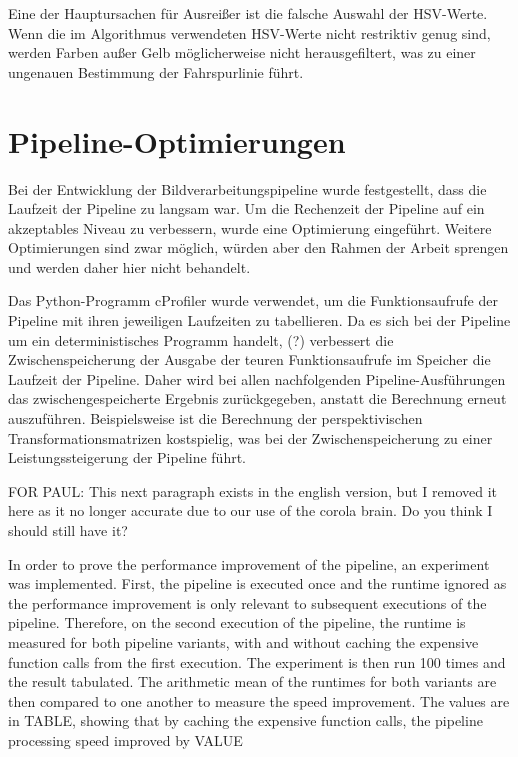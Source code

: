 \documentclass[arbeit=studie,oneside,BCOR=12mm]{ArbeitRST}
\begin{document}
Eine der Hauptursachen für Ausreißer ist die falsche Auswahl der HSV-Werte.
Wenn die im Algorithmus verwendeten HSV-Werte nicht restriktiv genug sind,
werden Farben außer Gelb möglicherweise nicht herausgefiltert, was zu einer
ungenauen Bestimmung der Fahrspurlinie führt.


\section{Pipeline-Optimierungen}

Bei der Entwicklung der Bildverarbeitungspipeline wurde festgestellt, dass die
Laufzeit der Pipeline zu langsam war. Um die Rechenzeit der Pipeline auf ein
akzeptables Niveau zu verbessern, wurde eine Optimierung eingeführt. Weitere
Optimierungen sind zwar möglich, würden aber den Rahmen der Arbeit sprengen und
werden daher hier nicht behandelt.

Das Python-Programm cProfiler wurde verwendet, um die Funktionsaufrufe der
Pipeline mit ihren jeweiligen Laufzeiten zu tabellieren. Da es sich bei der
Pipeline um ein deterministisches Programm handelt, (?) verbessert die
Zwischenspeicherung der Ausgabe der teuren Funktionsaufrufe im Speicher die
Laufzeit der Pipeline. Daher wird bei allen nachfolgenden Pipeline-Ausführungen
das zwischengespeicherte Ergebnis zurückgegeben, anstatt die Berechnung erneut
auszuführen. Beispielsweise ist die Berechnung der perspektivischen
Transformationsmatrizen kostspielig, was bei der Zwischenspeicherung zu einer
Leistungssteigerung der Pipeline führt.

FOR PAUL: 
This next paragraph exists in the english version, but I removed it here as it
no longer accurate due to our use of the corola brain.
Do you think I should still have it?


In order to prove the performance improvement of the pipeline, an experiment
was implemented. First, the pipeline is executed once and the runtime ignored
as the performance improvement is only relevant to subsequent executions of the
pipeline. Therefore, on the second execution of the pipeline, the runtime is
measured for both pipeline variants, with and without caching the expensive
function calls from the first execution. The experiment is then run 100 times
and the result tabulated. The arithmetic mean of the runtimes for both variants
are then compared to one another to measure the speed improvement. The values
are in TABLE, showing that by caching the expensive function calls, the
pipeline processing speed improved by VALUE%
\end{document}
